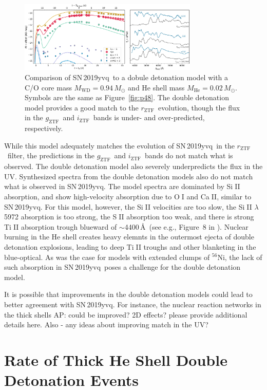 \documentclass[twocolumn]{aastex63}
\def\ion#1#2{#1$\;${\footnotesize\rm{#2}}\relax}
\newcommand{\abi}[1]{{\color{LincolnGreen} AP: {#1}}}
\newcommand{\rztf}{$r_\mathrm{ZTF}$}
\newcommand{\gztf}{$g_\mathrm{ZTF}$}
\newcommand{\iztf}{$i_\mathrm{ZTF}$}
\newcommand{\radni}{$^{56}$Ni}
\newcommand{\sn}{SN\,2019yvq}
\begin{document}
\begin{figure}
    \centering
    \includegraphics[width=3.35in]{./figures/double_det.pdf}
    \caption{Comparison of \sn\ to a dobule detonation model with a C/O core
    mass $M_\mathrm{WD} = 0.94\,M_\odot$ and He shell mass $M_\mathrm{He} =
    0.02\,M_\odot$. Symbols are the same as Figure~\ref{fig:p48}. The double
    detonation model provides a good match to the \rztf\ evolution, though
    the flux in the \gztf\ and \iztf\ bands is under- and over-predicted,
    respectively.}
    \label{fig:double_det}
\end{figure}

While this model adequately matches the evolution of \sn\ in the \rztf\
filter, the predictions in the \gztf\ and \iztf\ bands do not match what is
observed. The double detonation model also severely underpredicts the flux in
the UV. Synthesized spectra from the double detonation models also do not
match what is observed in \sn. The model spectra are dominated by
\ion{Si}{II} absorption, and show high-velocity absorption due to \ion{O}{I}
and \ion{Ca}{II}, similar to \sn. For this model, however, the \ion{Si}{II}
velocities are too slow, the \ion{Si}{II} $\lambda$5972 absorption is too
strong, the \ion{S}{II} absorption too weak, and there is strong \ion{Ti}{II}
absorption trough blueward of $\sim$4400\,\AA\ (see e.g., Figure~8 in
\citealt{Polin19}). Nuclear burning in the He shell creates heavy elemnts in
the outermost ejecta of double detonation explosions, leading to deep
\ion{Ti}{II} troughs and other blanketing in the blue-optical. As was the
case for models with extended clumps of \radni, the lack of such absorption
in \sn\ poses a challenge for the double detonation model.

It is possible that improvements in the double detonation models could lead
to better agreement with \sn. For instance, the nuclear reaction networks in
the thick shells \abi{could be improved? 2D effects? please provide
additional details here. Also - any ideas about improving match in the UV?}


\section{Rate of Thick He Shell Double Detonation Events}\label{sec:rates}
\end{document}
